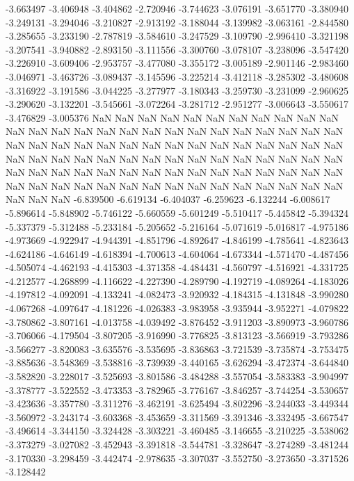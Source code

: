 -3.663497
-3.406948
-3.404862
-2.720946
-3.744623
-3.076191
-3.651770
-3.380940
-3.249131
-3.294046
-3.210827
-2.913192
-3.188044
-3.139982
-3.063161
-2.844580
-3.285655
-3.233190
-2.787819
-3.584610
-3.247529
-3.109790
-2.996410
-3.321198
-3.207541
-3.940882
-2.893150
-3.111556
-3.300760
-3.078107
-3.238096
-3.547420
-3.226910
-3.609406
-2.953757
-3.477080
-3.355172
-3.005189
-2.901146
-2.983460
-3.046971
-3.463726
-3.089437
-3.145596
-3.225214
-3.412118
-3.285302
-3.480608
-3.316922
-3.191586
-3.044225
-3.277977
-3.180343
-3.259730
-3.231099
-2.960625
-3.290620
-3.132201
-3.545661
-3.072264
-3.281712
-2.951277
-3.006643
-3.550617
-3.476829
-3.005376
NaN
NaN
NaN
NaN
NaN
NaN
NaN
NaN
NaN
NaN
NaN
NaN
NaN
NaN
NaN
NaN
NaN
NaN
NaN
NaN
NaN
NaN
NaN
NaN
NaN
NaN
NaN
NaN
NaN
NaN
NaN
NaN
NaN
NaN
NaN
NaN
NaN
NaN
NaN
NaN
NaN
NaN
NaN
NaN
NaN
NaN
NaN
NaN
NaN
NaN
NaN
NaN
NaN
NaN
NaN
NaN
NaN
NaN
NaN
NaN
NaN
NaN
NaN
NaN
NaN
NaN
NaN
NaN
NaN
NaN
NaN
NaN
NaN
NaN
NaN
NaN
NaN
NaN
NaN
NaN
NaN
NaN
NaN
NaN
NaN
NaN
NaN
NaN
NaN
-6.839500
-6.619134
-6.404037
-6.259623
-6.132244
-6.008617
-5.896614
-5.848902
-5.746122
-5.660559
-5.601249
-5.510417
-5.445842
-5.394324
-5.337379
-5.312488
-5.233184
-5.205652
-5.216164
-5.071619
-5.016817
-4.975186
-4.973669
-4.922947
-4.944391
-4.851796
-4.892647
-4.846199
-4.785641
-4.823643
-4.624186
-4.646149
-4.618394
-4.700613
-4.604064
-4.673344
-4.571470
-4.487456
-4.505074
-4.462193
-4.415303
-4.371358
-4.484431
-4.560797
-4.516921
-4.331725
-4.212577
-4.268899
-4.116622
-4.227390
-4.289790
-4.192719
-4.089264
-4.183026
-4.197812
-4.092091
-4.133241
-4.082473
-3.920932
-4.184315
-4.131848
-3.990280
-4.067268
-4.097647
-4.181226
-4.026383
-3.983958
-3.935944
-3.952271
-4.079822
-3.780862
-3.807161
-4.013758
-4.039492
-3.876452
-3.911203
-3.890973
-3.960786
-3.706066
-4.179504
-3.807205
-3.916990
-3.776825
-3.813123
-3.566919
-3.793286
-3.566277
-3.820083
-3.635576
-3.535695
-3.836863
-3.721539
-3.735874
-3.753475
-3.885636
-3.548369
-3.538816
-3.739939
-3.440165
-3.626294
-3.472374
-3.644840
-3.582820
-3.228017
-3.525693
-3.801586
-3.484288
-3.557054
-3.583383
-3.904997
-3.378777
-3.522552
-3.473353
-3.782965
-3.776167
-3.846257
-3.744254
-3.530657
-3.423636
-3.357780
-3.311276
-3.462191
-3.625494
-3.802296
-3.244033
-3.449344
-3.560972
-3.243174
-3.603368
-3.453659
-3.311569
-3.391346
-3.332495
-3.667547
-3.496614
-3.344150
-3.324428
-3.303221
-3.460485
-3.146655
-3.210225
-3.538062
-3.373279
-3.027082
-3.452943
-3.391818
-3.544781
-3.328647
-3.274289
-3.481244
-3.170330
-3.298459
-3.442474
-2.978635
-3.307037
-3.552750
-3.273650
-3.371526
-3.128442
